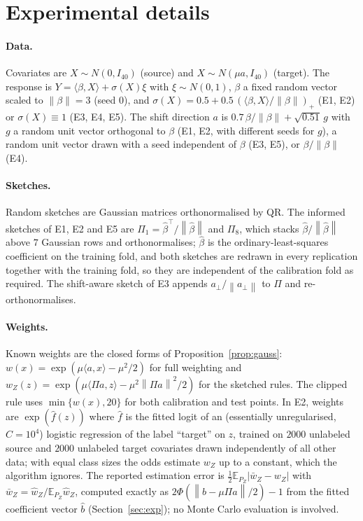 \documentclass[11pt,a4paper]{article}
\newcommand{\norm}[1]{\left\|#1\right\|}
\newcommand{\E}{\mathbb{E}}
\theoremstyle{plain}
\theoremstyle{definition}
\theoremstyle{remark}
\begin{document}
\section{Experimental details}\label{app:exp}

\paragraph{Data.} Covariates are $X\sim N(0,I_{40})$ (source) and $X\sim N(\mu a,I_{40})$ (target). The response is $Y=\langle\beta,X\rangle+\sigma(X)\xi$ with $\xi\sim N(0,1)$, $\beta$ a fixed random vector scaled to $\norm\beta=3$ (seed $0$), and $\sigma(X)=0.5+0.5\,(\langle\beta,X\rangle/\norm\beta)_+$ (E1, E2) or $\sigma(X)\equiv1$ (E3, E4, E5). The shift direction $a$ is $0.7\,\beta/\norm\beta+\sqrt{0.51}\,g$ with $g$ a random unit vector orthogonal to $\beta$ (E1, E2, with different seeds for $g$), a random unit vector drawn with a seed independent of $\beta$ (E3, E5), or $\beta/\norm\beta$ (E4).

\paragraph{Sketches.} Random sketches are Gaussian matrices orthonormalised by QR. The informed sketches of E1, E2 and E5 are $\Pi_1=\hat\beta^{\!\top}/\norm{\hat\beta}$ and $\Pi_8$, which stacks $\hat\beta/\norm{\hat\beta}$ above $7$ Gaussian rows and orthonormalises; $\hat\beta$ is the ordinary-least-squares coefficient on the training fold, and both sketches are redrawn in every replication together with the training fold, so they are independent of the calibration fold as required. The shift-aware sketch of E3 appends $a_\perp/\norm{a_\perp}$ to $\Pi$ and re-orthonormalises.

\paragraph{Weights.} Known weights are the closed forms of Proposition~\ref{prop:gauss}: $w(x)=\exp(\mu\langle a,x\rangle-\mu^2/2)$ for full weighting and $w_Z(z)=\exp(\mu\langle\Pi a,z\rangle-\mu^2\norm{\Pi a}^2/2)$ for the sketched rules. The clipped rule uses $\min\{w(x),20\}$ for both calibration and test points. In E2, weights are $\exp(\hat f(z))$ where $\hat f$ is the fitted logit of an (essentially unregularised, $C=10^4$) logistic regression of the label ``target'' on $z$, trained on $2000$ unlabeled source and $2000$ unlabeled target covariates drawn independently of all other data; with equal class sizes the odds estimate $w_Z$ up to a constant, which the algorithm ignores. The reported estimation error is $\tfrac12\E_{P_Z}|\bar w_Z-w_Z|$ with $\bar w_Z=\hat w_Z/\E_{P_Z}\hat w_Z$, computed exactly as $2\Phi(\norm{\hat b-\mu\Pi a}/2)-1$ from the fitted coefficient vector $\hat b$ (Section~\ref{sec:exp}); no Monte Carlo evaluation is involved.
\end{document}
